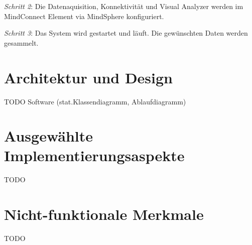 \textit{Schritt 2}: Die Datenaquisition, Konnektivität und Visual Analyzer werden im MindConnect Element via MindSphere konfiguriert.

\textit{Schritt 3}: Das System wird gestartet und läuft. Die gewünschten Daten werden gesammelt.







\section{Architektur und Design}
TODO
Software (stat.Klassendiagramm, Ablaufdiagramm)

\section{Ausgewählte Implementierungsaspekte}
TODO


\section{Nicht-funktionale Merkmale}
TODO







